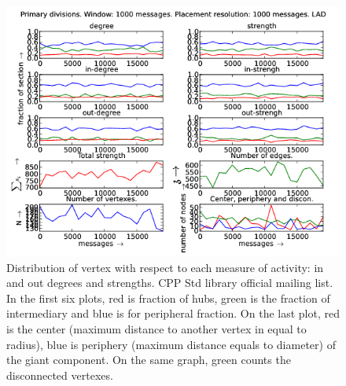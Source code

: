 \documentclass[%
 aip,
 jmp,%
 amsmath,amssymb,
 reprint,%
]{revtex4-1}
\begin{document}
\begin{figure}[hbtp] 
   \centering
        \includegraphics[width=\textwidth]{figs/LAD/1000}
    \caption{Distribution of vertex with respect to each measure of activity: in and out degrees and strengths. CPP Std library official mailing list. In the first six plots, red is fraction of hubs, green is the fraction of intermediary and blue is for peripheral fraction. On the last plot, red is the center (maximum distance to another vertex in equal to radius), blue is periphery (maximum distance equals to diameter) of the giant component. On the same graph, green counts the disconnected vertexes.}
    \label{fig:lad1000}
\end{figure}
\end{document}
